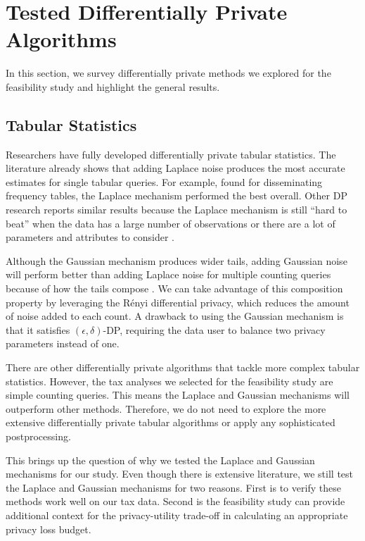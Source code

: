 \section{Tested Differentially Private Algorithms}\label{sec:dp-mech}
In this section, we survey differentially private methods we explored for the feasibility study and highlight the general results.

\subsection{Tabular Statistics}
Researchers have fully developed differentially private tabular statistics. The literature already shows that adding Laplace noise produces the most accurate estimates for single tabular queries. For example, \citet{rinott2018confidentiality} found for disseminating frequency tables, the Laplace mechanism performed the best overall. Other DP research reports similar results because the Laplace mechanism is still ``hard to beat'' when the data has a large number of observations or there are a lot of parameters and attributes to consider \citep{bowen2021differentially,shlomo2018statistical,liu2018generalized}.

Although the Gaussian mechanism produces wider tails, adding Gaussian noise will perform better than adding Laplace noise for multiple counting queries because of how the tails compose \citep{wang2019subsampled}. We can take advantage of this composition property by leveraging the R\'enyi differential privacy, which reduces the amount of noise added to each count. A drawback to using the Gaussian mechanism is that it satisfies $(\epsilon,\delta)$-DP, requiring the data user to balance two privacy parameters instead of one.

There are other differentially private algorithms that tackle more complex tabular statistics. However, the tax analyses we selected for the feasibility study are simple counting queries. This means the Laplace and Gaussian mechanisms will outperform other methods. Therefore, we do not need to explore the more extensive differentially private tabular algorithms or apply any sophisticated postprocessing.

This brings up the question of why we tested the Laplace and Gaussian mechanisms for our study. Even though there is extensive literature, we still test the Laplace and Gaussian mechanisms for two reasons. First is to verify these methods work well on our tax data. Second is the feasibility study can provide additional context for the privacy-utility trade-off in calculating an appropriate privacy loss budget.

